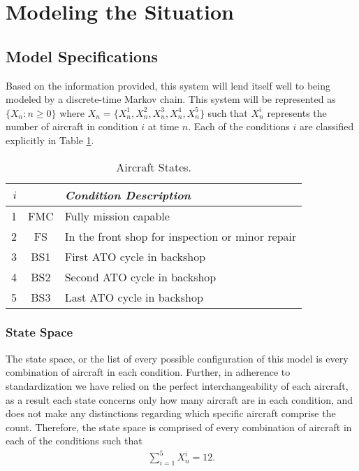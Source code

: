 \documentclass[12pt]{amsart}
\begin{document}
\section{Modeling the Situation}

\subsection{Model Specifications}

Based on the information provided, this system will lend itself well to being modeled 
by a discrete-time Markov chain.
This system will be represented as \(\{X_n : n\geq0\}\) where 
\(X_n = \{X_n^1,X_n^2,X_n^3,X_n^4,X_n^5\}\) such that
\(X_n^i\) represents the number of aircraft in condition \(i\) at time \(n\).
Each of the conditions \(i\) are classified explicitly in Table \ref{states}. \\

\begin{table}[H]
	\begin{tabular}{rcl}
		\toprule
		\(i\) & & \textit{Condition Description} \\
		\midrule
		1 & FMC & Fully mission capable \\
		2 & FS  & In the front shop for inspection or minor repair \\
		3 & BS1 & First ATO cycle in backshop \\
		4 & BS2 & Second ATO cycle in backshop \\
		5 & BS3 & Last ATO cycle in backshop \\
		\bottomrule
	\end{tabular}
	\caption{Aircraft States.}
	\label{states}
\end{table}

\subsubsection{State Space}

The state space, or the list of every possible configuration of this model is every
combination of aircraft in each condition.
Further, in adherence to standardization we have relied on the perfect interchangeability 
of each aircraft, as a result each state concerns only how many aircraft are in each condition,
and does not make any distinctions regarding which specific aircraft comprise the count.
Therefore, the state space is comprised of every combination of aircraft in each of the
conditions such that
\begin{align}
	\sum_{i=1}^{5}X_n^i = 12.
\end{align}
\end{document}
